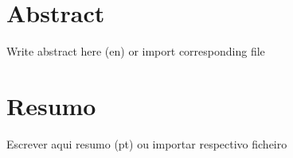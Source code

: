 \chapter*{Abstract}
Write abstract here (en) or import corresponding file

\cleardoublepage
\chapter*{Resumo}
Escrever aqui resumo (pt) ou importar respectivo ficheiro
